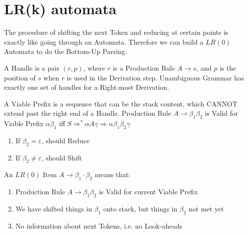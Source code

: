 \documentclass[a4paper]{exam}
\begin{document}
\section{LR(k) automata}
The procedure of shifting the next Token and reducing at certain points is exactly like going through an Automata. Therefore we can build a $L R(0)$ Automata to do the Bottom-Up Parsing.

A Handle is a pair $(r, p)$, where $r$ is a Production Rule $A \rightarrow s$, and $p$ is the position of $s$ when $r$ is used in the Derivation step. Unambiguous Grammar has exactly one set of handles for a Right-most Derivation.

A Viable Prefix is a sequence that can be the stack content, which CANNOT extend past the right end of a Handle. Production Rule $A \rightarrow \beta_{1} \beta_{2}$ is Valid for Viable Prefix $\alpha \beta_{1}$ iff $S \Rightarrow^{*} \alpha A \gamma \Rightarrow \alpha \beta_{1} \beta_{2} \gamma$
\begin{enumerate}
    \item If $\beta_{2}=\varepsilon$, should Reduce
    \item If $\beta_{2} \neq \varepsilon$, should Shift
\end{enumerate}
An $L R(0)$ Item $A \rightarrow \beta_{1} \cdot \beta_{2}$ means that:
\begin{enumerate}
    \item Production Rule $A \rightarrow \beta_{1} \beta_{2}$ is Valid for current Viable Prefix
\item We have shifted things in $\beta_{1}$ onto stack, but things in $\beta_{2}$ not met yet 
\item No information about next Tokens, i.e. no Look-aheads
\end{enumerate}
\end{document}
